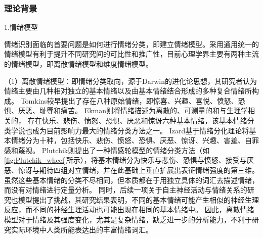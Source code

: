\subsubsection{理论背景}

1.情绪模型

情绪识别面临的首要问题是如何进行情绪分类，即建立情绪模型。采用通用统一的情绪模型有利于提升不同研究间的可比性和推广性，目前心理学界主要有两种主流的情绪模型，即离散情绪模型和维度情绪模型。

    
（1）离散情绪模型：即情绪分类取向，源于Darwin的进化论思想\cite{Darwin2015}，其研究者认为情绪主要由几种相对独立的基本情绪以及由基本情绪结合形成的多种复合情绪所构成。
Tomkins\cite{Tomkins1970}较早提出了存在八种原始情绪，即惊喜、兴趣、喜悦、愤怒、恐惧、厌恶、耻辱和痛苦。
Ekman\cite{Ekman1971,Ekman1992}则将情绪描述为离散的、可测量的和与生理学相关的，
存在快乐、悲伤、愤怒、恐惧、厌恶和惊讶六种基本情绪，该基本情绪分类学说也成为目前影响力最大的情绪分类方法之一。
Izard\cite{Izard1991}基于情绪分化理论将基本情绪分为十种，包括快乐、悲伤、愤怒、恐惧、厌恶、惊讶、兴趣、害羞、自罪感和蔑视。
Plutchik\cite{Plutchik2001}则提出了一种情感轮模型的情绪分类方法（如\autoref{fig:Plutchik_wheel}所示），将基本情绪分为快乐与悲伤、恐惧与愤怒、接受与厌恶、惊讶与期待四组对立情绪，并在此基础上垂直扩展出表征情绪强度的第三维。
虽然这些基本情绪的分类不尽相同，但本质都在于用独立具体的词汇去描述情绪，而没有对情绪进行定量分析。
同时，后续一项关于自主神经活动与情绪关系的研究也模型提出了挑战，其研究结果表明，不同的基本情绪可能产生相似的神经生理反应，而不同的神经生理活动也可能出现在相同的基本情绪中\cite{Cacioppo2000}。
因此，离散情绪模型对于情绪及其强度变化，尤其是复杂情绪，缺乏进一步的分析能力，不利于研究实际环境中人类所能表达出的丰富情绪词汇。


